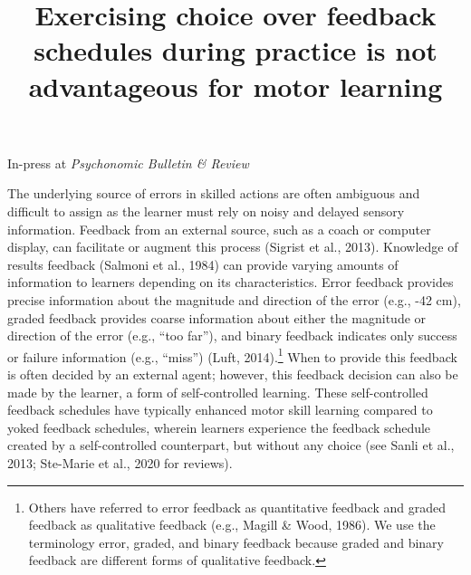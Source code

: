 \documentclass[
  doc, donotrepeattitle,floatsintext]{apa7}
\title{Exercising choice over feedback schedules during practice is not advantageous for motor learning}
\author{\phantom{0}}
\date{}
\affiliation{\phantom{0}}
\begin{document}
\maketitle

\vspace{-1.1em}
\begin{center}
\begin{tcolorbox}[colframe=blue!75!black,boxrule=0.75pt,arc=5pt,width=4in]
\centering\textcolor{blue!75!black}{In-press at \emph{Psychonomic Bulletin \& Review}}
\end{tcolorbox}
\end{center}
\vspace{0.5em}

The underlying source of errors in skilled actions are often ambiguous and difficult to assign as the learner must rely on noisy and delayed sensory information. Feedback from an external source, such as a coach or computer display, can facilitate or augment this process (Sigrist et al., 2013). Knowledge of results feedback (Salmoni et al., 1984) can provide varying amounts of information to learners depending on its characteristics. Error feedback provides precise information about the magnitude and direction of the error (e.g., -42 cm), graded feedback provides coarse information about either the magnitude or direction of the error (e.g., ``too far''), and binary feedback indicates only success or failure information (e.g., ``miss'') (Luft, 2014).\footnote{Others have referred to error feedback as quantitative feedback and graded feedback as qualitative feedback (e.g., Magill \& Wood, 1986). We use the terminology error, graded, and binary feedback because graded and binary feedback are different forms of qualitative feedback.} When to provide this feedback is often decided by an external agent; however, this feedback decision can also be made by the learner, a form of self-controlled learning. These self-controlled feedback schedules have typically enhanced motor skill learning compared to yoked feedback schedules, wherein learners experience the feedback schedule created by a self-controlled counterpart, but without any choice (see Sanli et al., 2013; Ste-Marie et al., 2020 for reviews).
\end{document}
